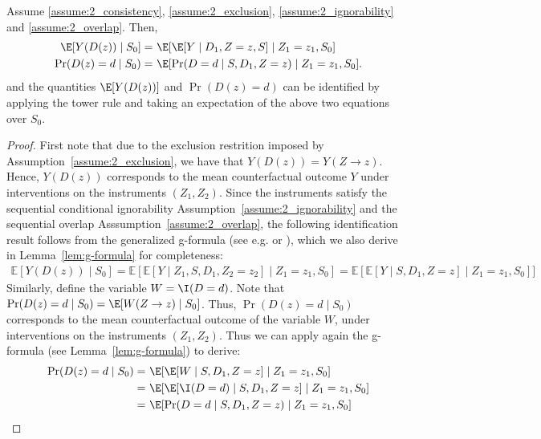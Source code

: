 \begin{lemma}\label{lem:2_dte}
Assume \ref{assume:2_consistency}, \ref{assume:2_exclusion}, \ref{assume:2_ignorability} and \ref{assume:2_overlap}.
Then, 
\begin{align*}
\E[Y(D(z))\mid S_0]
=~& \E[\E[Y \mid D_1, Z=z, S] \mid Z_1=z_1, S_0]\\
\Pr(D(z)=d\mid S_0)
=~& \E[\Pr(D=d\mid S, D_1, Z=z)\mid Z_1=z_1, S_0].
\end{align*}
and the quantities $\E[Y(D(z))]$ and $\Pr(D(z)=d)$ can be identified by applying the tower rule and taking an expectation of the above two equations over $S_0$.
\end{lemma}
\begin{proof}
First note that due to the exclusion restrition imposed by Assumption~\ref{assume:2_exclusion}, we have that $Y(D(z))=Y(Z\to z)$. Hence, $Y(D(z))$ corresponds to the mean counterfactual outcome $Y$ under interventions on the instruments $(Z_1, Z_2)$. Since the instruments satisfy the sequential conditional ignorability Assumption~\ref{assume:2_ignorability} and the sequential overlap Asssumption~\ref{assume:2_overlap}, the following identification result follows from the generalized g-formula (see e.g. \cite[Chapter 21]{hernancausal} or \cite[Theorem 1]{chernozhukov2022automatic}), which we also derive in Lemma~\ref{lem:g-formula} for completeness:
\begin{align*}
    \mathbb{E}[Y(D(z))\mid S_0] = \mathbb{E}[ 
    \mathbb{E}[Y \mid Z_1, S, D_1, Z_2=z_2] \mid Z_1=z_1, S_0] = 
    \mathbb{E}[\mathbb{E}[Y \mid S, D_1, Z=z] \mid Z_1=z_1, S_0]
  ]
\end{align*}
Similarly, define the variable $W=\I(D=d)$. Note that $\Pr(D(z)=d\mid S_0) = \E[W(Z\to z)\mid S_0]$. Thus, $\Pr(D(z)=d\mid S_0)$ corresponds to the mean counterfactual outcome of the variable $W$, under interventions on the instruments $(Z_1, Z_2)$. Thus we can apply again the g-formula (see Lemma~\ref{lem:g-formula}) to derive:
\begin{align*}
    \Pr(D(z)=d\mid S_0) =~& \E[\E[W\mid S, D_1, Z=z]\mid Z_1=z_1, S_0]\\
    =~& \E[\E[\I(D=d)\mid S, D_1, Z=z]\mid Z_1=z_1, S_0]\\
    =~& \E[\Pr(D=d\mid S, D_1, Z=z)\mid Z_1=z_1, S_0]
\end{align*}




\end{proof}



